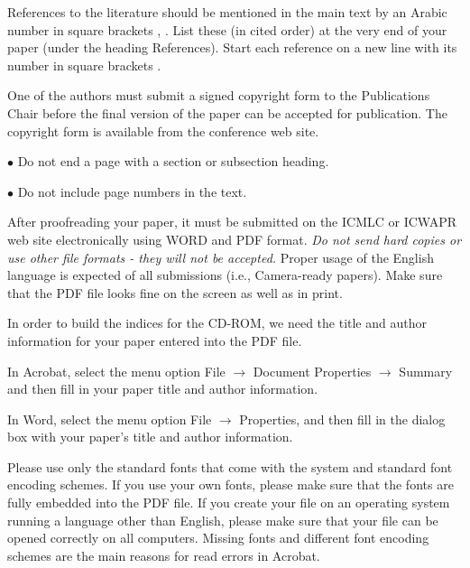 \documentclass[a4paper, times, 10pt,twocolumn]{article}
\begin{document}

References to the literature should be mentioned in the main text by
an Arabic number in square brackets \cite{Peter}, \cite{John}. List
these (in cited order) at the very end of your paper (under the
heading References). Start each reference on a new line with its
number in square brackets \cite{Xizhao}.


One of the authors must submit a signed copyright form to the
Publications Chair before the final version of the paper can be
accepted for publication. The copyright form is available from the
conference web site.

\hspace{-3ex}    $\bullet$ \hspace{1ex} Do not end a page with a
section or subsection heading.

 \hspace{-3ex}    $\bullet$ \hspace{1ex} Do not include page numbers in the text.



After proofreading your paper, it must be submitted on the ICMLC or ICWAPR web site electronically using WORD and PDF format.
{\it Do not send hard copies or use other file formats - they will
not be accepted.} Proper usage of the English language is expected
of all submissions (i.e., Camera-ready papers). Make sure that the
PDF file looks fine on the screen as well as in print.

In order to build the indices for the CD-ROM, we need the title and
author information for your paper entered into the PDF file.

In Acrobat, select the menu option File $\longrightarrow$ Document
Properties $\longrightarrow$ Summary and then fill in your paper
title and author information.

In Word, select the menu option File $\longrightarrow$ Properties,
and then fill in the dialog box with your paper's title and author
information.

Please use only the standard fonts that come with the system and
standard font encoding schemes. If you use your own fonts, please
make sure that the fonts are fully embedded into the PDF file. If
you create your file on an operating system running a language other
than English, please make sure that your file can be opened
correctly on all computers. Missing fonts and different font
encoding schemes are the main reasons for read errors in Acrobat.
\end{document}
